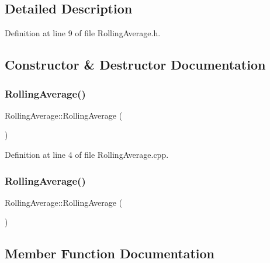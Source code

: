 \subsection{Detailed Description}


Definition at line 9 of file Rolling\+Average.\+h.



\subsection{Constructor \& Destructor Documentation}
\mbox{\label{class_rolling_average_ae87ed45e2fb2c7a8209382095916a245}} 
\subsubsection{\texorpdfstring{Rolling\+Average()}{RollingAverage()}\hspace{0.1cm}{\footnotesize\ttfamily [1/2]}}
{\footnotesize\ttfamily Rolling\+Average\+::\+Rolling\+Average (\begin{DoxyParamCaption}{ }\end{DoxyParamCaption})}



Definition at line 4 of file Rolling\+Average.\+cpp.

\mbox{\label{class_rolling_average_ae87ed45e2fb2c7a8209382095916a245}} 
\subsubsection{\texorpdfstring{Rolling\+Average()}{RollingAverage()}\hspace{0.1cm}{\footnotesize\ttfamily [2/2]}}
{\footnotesize\ttfamily Rolling\+Average\+::\+Rolling\+Average (\begin{DoxyParamCaption}{ }\end{DoxyParamCaption})}



\subsection{Member Function Documentation}
\mbox{\label{class_rolling_average_ada0ea15c7152230f9433329fba92d3f8}} 
